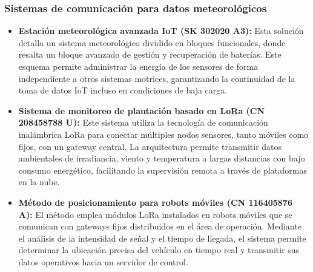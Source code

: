 \documentclass[../../General.tex]{subfiles}
\begin{document}
\subsubsection{Sistemas de comunicación para datos meteorológicos}
\begin{itemize}
    \item \textbf{Estación meteorológica avanzada IoT (SK 302020 A3):} Esta solución detalla un sistema meteorológico dividido en bloques funcionales, donde resalta un bloque avanzado de gestión y recuperación de baterías. Este esquema permite administrar la energía de los sensores de forma independiente a otros sistemas motrices, garantizando la continuidad de la toma de datos IoT incluso en condiciones de baja carga.
    
    \item \textbf{Sistema de monitoreo de plantación basado en LoRa (CN 208458788 U):} Este sistema utiliza la tecnología de comunicación inalámbrica LoRa para conectar múltiples nodos sensores, tanto móviles como fijos, con un gateway central. La arquitectura permite transmitir datos ambientales de irradiancia, viento y temperatura a largas distancias con bajo consumo energético, facilitando la supervisión remota a través de plataformas en la nube.
    
    \item \textbf{Método de posicionamiento para robots móviles (CN 116405876 A):} El método emplea módulos LoRa instalados en robots móviles que se comunican con gateways fijos distribuidos en el área de operación. Mediante el análisis de la intensidad de señal y el tiempo de llegada, el sistema permite determinar la ubicación precisa del vehículo en tiempo real y transmitir sus datos operativos hacia un servidor de control.
\end{itemize}
\end{document}

